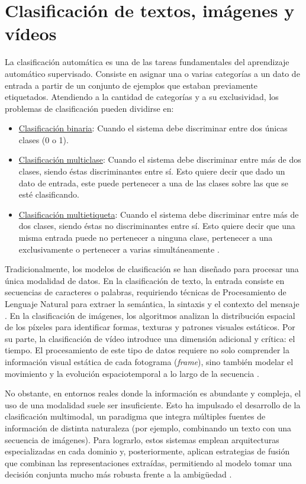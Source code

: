 \section{Clasificación de textos, imágenes y vídeos}
\label{sec:Clasificacion}
La clasificación automática es una de las tareas fundamentales del aprendizaje automático supervisado. Consiste en asignar una o varias categorías a un dato de entrada a partir de un conjunto de ejemplos que estaban previamente etiquetados. Atendiendo a la cantidad de categorías y a su exclusividad, los problemas de clasificación pueden dividirse en:
\begin{itemize}
    \item \underline{Clasificación binaria}: Cuando el sistema debe discriminar entre dos únicas clases (0 o 1).
    \item \underline{Clasificación multiclase}: Cuando el sistema debe discriminar entre más de dos clases, siendo éstas discriminantes entre sí. Esto quiere decir que dado un dato de entrada, este puede pertenecer a una de las clases sobre las que se esté clasificando.
    \item \underline{Clasificación multietiqueta}: Cuando el sistema debe discriminar entre más de dos clases, siendo éstas no discriminantes entre sí. Esto quiere decir que una misma entrada puede no pertenecer a ninguna clase, pertenecer a una exclusivamente o pertenecer a varias simultáneamente \cite{zhang2013review}. 
\end{itemize}

Tradicionalmente, los modelos de clasificación se han diseñado para procesar una única modalidad de datos. En la clasificación de texto, la entrada consiste en secuencias de caracteres o palabras, requiriendo técnicas de Procesamiento de Lenguaje Natural para extraer la semántica, la sintaxis y el contexto del mensaje \cite{minaee2021deep}. En la clasificación de imágenes, los algoritmos analizan la distribución espacial de los píxeles para identificar formas, texturas y patrones visuales estáticos. Por su parte, la clasificación de vídeo introduce una dimensión adicional y crítica: el tiempo. El procesamiento de este tipo de datos requiere no solo comprender la información visual estática de cada fotograma (\textit{frame}), sino también modelar el movimiento y la evolución espaciotemporal a lo largo de la secuencia \cite{karpathy2014large}. 

No obstante, en entornos reales donde la información es abundante y compleja, el uso de una modalidad suele ser insuficiente. Esto ha impulsado el desarrollo de la clasificación multimodal, un paradigma que integra múltiples fuentes de información de distinta naturaleza (por ejemplo, combinando un texto con una secuencia de imágenes). Para lograrlo, estos sistemas emplean arquitecturas especializadas en cada dominio y, posteriormente, aplican estrategias de fusión que combinan las representaciones extraídas, permitiendo al modelo tomar una decisión conjunta mucho más robusta frente a la ambigüedad \cite{baltruvsaitis2018multimodal}.

